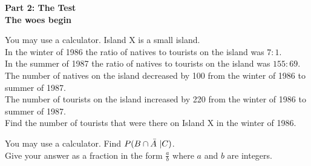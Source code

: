 \documentclass{exam}
\begin{document}
\newpage
\begin{titlepage}
    \begin{center}

        \vspace*{\fill}
        \Huge \textbf{Part 2: The Test}\\
        \vspace*{1cm}
        \vspace*{1cm}
        \large \textbf{The woes begin}\\
        \vspace*{\fill}
        
    \end{center}
\end{titlepage}
\newpage

\begin{questions}
    
    \question You may use a calculator. Island X is a small island.\\
    In the winter of 1986 the ratio of natives to tourists on the island was $7:1$.\\
    In the summer of 1987 the ratio of natives to tourists on the island was $155:69$.\\
    The number of natives on the island decreased by 100 from the winter of 1986 to summer of 1987.\\
    The number of tourists on the island increased by 220 from the winter of 1986 to summer of 1987.\\

    Find the number of tourists that were there on Island X in the winter of 1986.
    \newpage

    \question You may use a calculator. Find $P(B\cap\Bar{A}\ | C )$.\\
    Give your answer as a fraction in the form $\frac{a}{b}$ where $a$ and $b$ are integers.
\end{questions}
\end{document}
